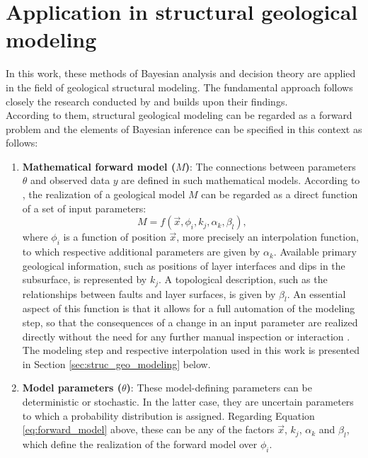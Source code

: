         \section{Application in structural geological modeling}\label{sec:bayes_in_struc_modeling}
        In this work, these methods of Bayesian analysis and decision theory are applied in the field of geological structural modeling. The fundamental approach follows closely the research conducted by \citet{delaVarga2016} and builds upon their findings.\\
        According to them, structural geological modeling can be regarded as a forward problem and the elements of Bayesian inference can be specified in this context as follows:
        \begin{enumerate}
        	\item \textbf{Mathematical forward model ($M$)}: The connections between parameters $\theta$ and observed data $y$ are defined in such mathematical models. According to \citet{delaVarga2016}, the realization of a geological model $M$ can be regarded as a direct function of a set of input parameters:
        	\begin{equation}
        	M = f(\vec{x}, \phi_i, k_j, \alpha_k, \beta_l)\label{eq:forward_model},
        	\end{equation}
        	where $\phi_i$ is a function of position $\vec{x}$, more precisely an interpolation function, to which respective additional parameters are given by $\alpha_k$. Available primary geological information, such as positions of layer interfaces and dips in the subsurface, is represented by $k_j$. A topological description, such as the relationships between faults and layer surfaces, is given by $\beta_l$. An essential aspect of this function is that it allows for a full automation of the modeling step, so that the consequences of a change in an input parameter are realized directly without the need for any further manual inspection or interaction \citep{wellmann2017sandstone}. The modeling step and respective interpolation used in this work is presented in Section \ref{sec:struc_geo_modeling} below.
        	\item \textbf{Model parameters ($\theta$)}: These model-defining parameters can be deterministic or stochastic. In the latter case, they are uncertain parameters to which a probability distribution is assigned. Regarding Equation \ref{eq:forward_model} above, these can be any of the factors $\vec{x}$, $k_j$, $\alpha_k$ and $\beta_l$, which define the realization of the forward model over $\phi_i$.

\end{enumerate}
